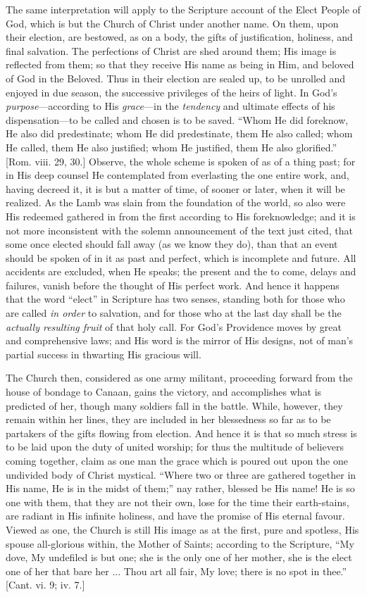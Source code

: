The same interpretation will apply to the Scripture account of the
Elect People of God, which is but the Church of Christ under another
name. On them, upon their election, are bestowed, as on a body, the
gifts of justification, holiness, and final salvation. The perfections
of Christ are shed around them; His image is reflected from them; so
that they receive His name as being in Him, and beloved of God in the
Beloved. Thus in their election are sealed up, to be unrolled and
enjoyed in due season, the successive privileges of the heirs of
light. In God's \emph{purpose}—according to His \emph{grace}—in
the \emph{tendency} and ultimate effects of his dispensation—to be
called and chosen is to be saved. ``Whom He did foreknow, He also
did predestinate; whom He did predestinate, them He also called; whom
He called, them He also justified; whom He justified, them He also
glorified.'' [Rom. viii. 29, 30.] Observe, the whole scheme is
spoken of as of a thing past; for in His deep counsel He contemplated
from everlasting the one entire work, and, having decreed it, it is
but a matter of time, of sooner or later, when it will be realized. As
the Lamb was slain from the foundation of the world, so also were His
redeemed gathered in from the first according to His foreknowledge;
and it is not more inconsistent with the solemn announcement of the
text just cited, that some once elected should fall away (as we know
they do), than that an event should be spoken of in it as past and
perfect, which is incomplete and future. All accidents are excluded,
when He speaks; the present and the to come, delays and failures,
vanish before the thought of His perfect work. And hence it happens
that the word ``elect'' in Scripture has two senses, standing
both for those who are called \emph{in order} to salvation, and for
those who at the last day shall be the \emph{actually resulting fruit}
of that holy call. For God's Providence moves by great and
comprehensive laws; and His word is the mirror of His designs, not of
man's partial success in thwarting His gracious will.

The Church then, considered as one army militant, proceeding
forward from the house of bondage to Canaan, gains the victory, and
accomplishes what is predicted of her, though many soldiers fall in
the battle. While, however, they remain within her lines, they are
included in her blessedness so far as to be partakers of the gifts
flowing from election. And hence it is that so much stress is to be
laid upon the duty of united worship; for thus the multitude of
believers coming together, claim as one man the grace which is poured
out upon the one undivided body of Christ mystical. ``Where two or
three are gathered together in His name, He is in the midst of
them;'' nay rather, blessed be His name! He is so one with them,
that they are not their own, lose for the time their earth-stains, are
radiant in His infinite holiness, and have the promise of His eternal
favour. Viewed as one, the Church is still His image as at the first,
pure and spotless, His spouse all-glorious within, the Mother of
Saints; according to the Scripture, ``My dove, My undefiled is but
one; she is the only one of her mother, she is the elect one of her
that bare her ... Thou art all fair, My love; there is no spot in
thee.'' [Cant. vi. 9; iv. 7.]

